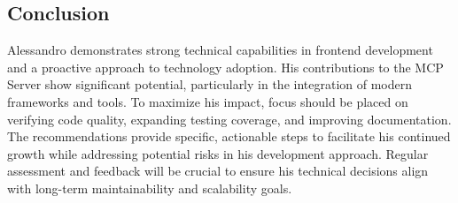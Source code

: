 \documentclass[10pt,a4paper]{article}
\begin{document}
\begin{multicols}{2}
\section*{Conclusion}
Alessandro demonstrates strong technical capabilities in frontend development and a proactive approach to technology adoption. His contributions to the MCP Server show significant potential, particularly in the integration of modern frameworks and tools. To maximize his impact, focus should be placed on verifying code quality, expanding testing coverage, and improving documentation. The recommendations provide specific, actionable steps to facilitate his continued growth while addressing potential risks in his development approach. Regular assessment and feedback will be crucial to ensure his technical decisions align with long-term maintainability and scalability goals.
\end{multicols}
\end{document}
